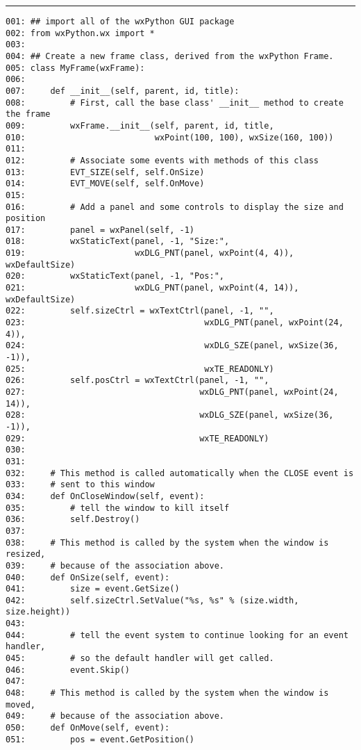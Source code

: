 \begin{indented}{1cm}
\end{indented}

\hrule

\begin{verbatim}
001: ## import all of the wxPython GUI package
002: from wxPython.wx import *
003:
004: ## Create a new frame class, derived from the wxPython Frame.
005: class MyFrame(wxFrame):
006:
007:     def __init__(self, parent, id, title):
008:         # First, call the base class' __init__ method to create the frame
009:         wxFrame.__init__(self, parent, id, title,
010:                          wxPoint(100, 100), wxSize(160, 100))
011:
012:         # Associate some events with methods of this class
013:         EVT_SIZE(self, self.OnSize)
014:         EVT_MOVE(self, self.OnMove)
015:
016:         # Add a panel and some controls to display the size and position
017:         panel = wxPanel(self, -1)
018:         wxStaticText(panel, -1, "Size:",
019:                      wxDLG_PNT(panel, wxPoint(4, 4)),  wxDefaultSize)
020:         wxStaticText(panel, -1, "Pos:",
021:                      wxDLG_PNT(panel, wxPoint(4, 14)), wxDefaultSize)
022:         self.sizeCtrl = wxTextCtrl(panel, -1, "",
023:                                    wxDLG_PNT(panel, wxPoint(24, 4)),
024:                                    wxDLG_SZE(panel, wxSize(36, -1)),
025:                                    wxTE_READONLY)
026:         self.posCtrl = wxTextCtrl(panel, -1, "",
027:                                   wxDLG_PNT(panel, wxPoint(24, 14)),
028:                                   wxDLG_SZE(panel, wxSize(36, -1)),
029:                                   wxTE_READONLY)
030:
031:
032:     # This method is called automatically when the CLOSE event is
033:     # sent to this window
034:     def OnCloseWindow(self, event):
035:         # tell the window to kill itself
036:         self.Destroy()
037:
038:     # This method is called by the system when the window is resized,
039:     # because of the association above.
040:     def OnSize(self, event):
041:         size = event.GetSize()
042:         self.sizeCtrl.SetValue("%s, %s" % (size.width, size.height))
043:
044:         # tell the event system to continue looking for an event handler,
045:         # so the default handler will get called.
046:         event.Skip()
047:
048:     # This method is called by the system when the window is moved,
049:     # because of the association above.
050:     def OnMove(self, event):
051:         pos = event.GetPosition()

\end{verbatim}
